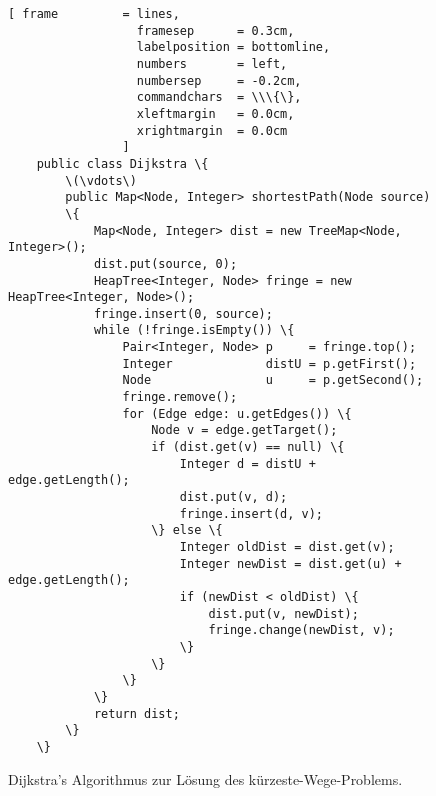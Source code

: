 \begin{figure}[!ht]
  \centering
\begin{Verbatim}[ frame         = lines, 
                  framesep      = 0.3cm, 
                  labelposition = bottomline,
                  numbers       = left,
                  numbersep     = -0.2cm,
                  commandchars  = \\\{\}, 
                  xleftmargin   = 0.0cm,
                  xrightmargin  = 0.0cm
                ]
    public class Dijkstra \{
        \(\vdots\)
        public Map<Node, Integer> shortestPath(Node source) 
        \{
            Map<Node, Integer> dist = new TreeMap<Node, Integer>();
            dist.put(source, 0);
            HeapTree<Integer, Node> fringe = new HeapTree<Integer, Node>();
            fringe.insert(0, source);
            while (!fringe.isEmpty()) \{
                Pair<Integer, Node> p     = fringe.top();
                Integer             distU = p.getFirst();
                Node                u     = p.getSecond();
                fringe.remove();
                for (Edge edge: u.getEdges()) \{
                    Node v = edge.getTarget();
                    if (dist.get(v) == null) \{
                        Integer d = distU + edge.getLength();
                        dist.put(v, d);
                        fringe.insert(d, v);
                    \} else \{
                        Integer oldDist = dist.get(v);
                        Integer newDist = dist.get(u) + edge.getLength();
                        if (newDist < oldDist) \{
                            dist.put(v, newDist);
                            fringe.change(newDist, v);
                        \}
                    \}
                \}
            \}
            return dist;
        \}
    \}
\end{Verbatim}
\vspace*{-0.3cm}
  \caption{Dijkstra's Algorithmus zur L\"osung des k\"urzeste-Wege-Problems.}
  \label{fig:dijkstra}
\end{figure}

